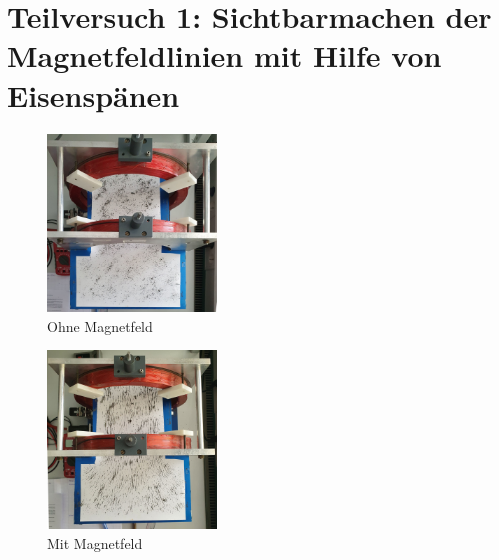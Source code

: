 \section{Teilversuch 1: Sichtbarmachen der Magnetfeldlinien mit Hilfe von Eisenspänen}
	\vfill
	\begin{multicols}{2}
		\begin{figure}[H]
			\centering
			\includegraphics[width=0.4\textwidth]{./images/tv1-before-small.jpg}
			\caption{Ohne Magnetfeld}
		\end{figure}
		\begin{figure}[H]
			\centering
			\includegraphics[width=0.4\textwidth]{./images/tv1-after-small.jpg}
			\caption{Mit Magnetfeld}
		\end{figure}
	\end{multicols}
	\vfill
